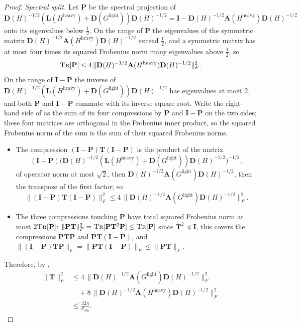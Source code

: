 \documentclass[11pt]{article}
\theoremstyle{remark}
\renewcommand{\AA}{\mathbf A}
\newcommand{\DD}{\mathbf D}
\newcommand{\II}{\mathbf I}
\newcommand{\LL}{\mathbf L}
\newcommand{\PP}{\mathbf P}
\newcommand{\TT}{\mathbf T}
\newcommand{\dheavy}{\theta_{\deg}}
\newcommand{\Gl}{G^{\mathrm{light}}}
\newcommand{\norm}[1]{\lVert#1\rVert}
\newcommand{\tr}{\textsc{Tr}}
\begin{document}
\begin{proof}
\emph{Spectral split.}
Let $\PP$ be the spectral projection of
\[
\DD(H)^{-1/2}(\LL(H^{\mathrm{heavy}})+\DD(\Gl))\DD(H)^{-1/2}
=\II-\DD(H)^{-1/2}\AA(H^{\mathrm{heavy}})\DD(H)^{-1/2}
\]
onto its eigenvalues below $\frac12$.
On the range of $\PP$ the eigenvalues of the symmetric matrix
$\DD(H)^{-1/2}\AA(H^{\mathrm{heavy}})\DD(H)^{-1/2}$ exceed $\frac12$, and a
symmetric matrix has at most four times its squared Frobenius norm many
eigenvalues above $\frac12$, so
\[
\tr[\PP]\le4\,\norm{\DD(H)^{-1/2}\AA(H^{\mathrm{heavy}})\DD(H)^{-1/2}}_F^{2}.
\]
On the range of $\II-\PP$ the inverse of
$\DD(H)^{-1/2}(\LL(H^{\mathrm{heavy}})+\DD(\Gl))\DD(H)^{-1/2}$ has eigenvalues
at most $2$, and both $\PP$ and $\II-\PP$ commute with its inverse square
root.
Write the right-hand side of  as the sum of its four
compressions by $\PP$ and $\II-\PP$ on the two sides; these four matrices are
orthogonal in the Frobenius inner product, so the squared Frobenius norm of
the sum is the sum of their squared Frobenius norms.
\begin{itemize}[leftmargin=*]
\item The compression $(\II-\PP)\TT(\II-\PP)$ is the product of the matrix
\[
(\II-\PP)\bigl(\DD(H)^{-1/2}(\LL(H^{\mathrm{heavy}})+\DD(\Gl))\DD(H)^{-1/2}\bigr)^{-1/2},
\]
of operator norm at most $\sqrt2$, then $\DD(H)^{-1/2}\AA(\Gl)\DD(H)^{-1/2}$,
then the transpose of the first factor; so
\[
\norm{(\II-\PP)\TT(\II-\PP)}_F^{2}\le4\,\norm{\DD(H)^{-1/2}\AA(\Gl)\DD(H)^{-1/2}}_F^{2}.
\]
\item The three compressions touching $\PP$ have total squared Frobenius
norm at most $2\tr[\PP]$: $\norm{\PP\TT}_F^{2}=\tr[\PP\TT^{2}\PP]\le\tr[\PP]$
since $\TT^{2}\preceq\II$, this covers the compressions $\PP\TT\PP$ and
$\PP\TT(\II-\PP)$, and
$\norm{(\II-\PP)\TT\PP}_F=\norm{\PP\TT(\II-\PP)}_F\le\norm{\PP\TT}_F$.
\end{itemize}
Therefore, by ,
\begin{align*}
\norm{\TT}_F^{2}
&\le4\,\norm{\DD(H)^{-1/2}\AA(\Gl)\DD(H)^{-1/2}}_F^{2}\\
&\quad+8\,\norm{\DD(H)^{-1/2}\AA(H^{\mathrm{heavy}})\DD(H)^{-1/2}}_F^{2}\\
&\le\frac{32n}{\dheavy}.
\end{align*}


\end{proof}
\end{document}
